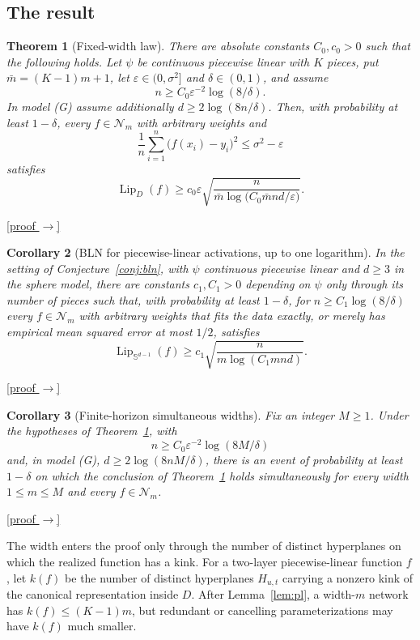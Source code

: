 \documentclass[11pt,reqno]{amsart}
\theoremstyle{plain}
\newtheorem{theorem}{Theorem}[section]
\newtheorem{corollary}[theorem]{Corollary}
\theoremstyle{definition}
\theoremstyle{remark}
\newcommand{\Sd}{\mathbb{S}^{d-1}}
\newcommand{\eps}{\varepsilon}
\newcommand{\Lip}{\operatorname{Lip}}
\newcommand{\NN}{\mathcal{N}}
\newcommand{\proofbutton}[1]{\hyperref[proof:#1]{\textnormal{\footnotesize\textsf{[proof $\to$]}}}}
\begin{document}
\subsection{The result}

\begin{theorem}[Fixed-width law]\label{thm:main}
There are absolute constants $C_0,c_0>0$ such that the following holds. Let $\psi$ be continuous piecewise linear with $K$ pieces, put $\bar m=(K-1)m+1$, let $\eps\in(0,\sigma^2]$ and $\delta\in(0,1)$, and assume
\[
        n\ge C_0\eps^{-2}\log(8/\delta).
\]
In model (G) assume additionally $d\ge2\log(8n/\delta)$. Then, with probability at least $1-\delta$, every $f\in\NN_m$ with arbitrary weights and
\[
\frac1n\sum_{i=1}^n\bigl(f(x_i)-y_i\bigr)^2\le\sigma^2-\eps
\]
satisfies
\[
\Lip_D(f)\ge c_0\eps\sqrt{\frac{n}{\bar m\log\!\bigl(C_0\bar mnd/\eps\bigr)}}.
\]
\end{theorem}
\proofbutton{main}

\begin{corollary}[BLN for piecewise-linear activations, up to one logarithm]\label{cor:bln}
In the setting of Conjecture~\ref{conj:bln}, with $\psi$ continuous piecewise linear and $d\ge3$ in the sphere model, there are constants $c_1,C_1>0$ depending on $\psi$ only through its number of pieces such that, with probability at least $1-\delta$, for $n\ge C_1\log(8/\delta)$ every $f\in\NN_m$ with arbitrary weights that fits the data exactly, or merely has empirical mean squared error at most $1/2$, satisfies
\[
\Lip_{\Sd}(f)\ge c_1\sqrt{\frac{n}{m\log(C_1mnd)}}.
\]
\end{corollary}
\proofbutton{bln}

\begin{corollary}[Finite-horizon simultaneous widths]\label{cor:simul}
Fix an integer $M\ge1$. Under the hypotheses of Theorem~\ref{thm:main}, with
\[
        n\ge C_0\eps^{-2}\log(8M/\delta)
\]
and, in model (G), $d\ge2\log(8nM/\delta)$, there is an event of probability at least $1-\delta$ on which the conclusion of Theorem~\ref{thm:main} holds simultaneously for every width $1\le m\le M$ and every $f\in\NN_m$.
\end{corollary}
\proofbutton{simul}

The width enters the proof only through the number of distinct hyperplanes on which the realized function has a kink. For a two-layer piecewise-linear function $f$, let $k(f)$ be the number of distinct hyperplanes $H_{u,t}$ carrying a nonzero kink of the canonical representation inside $D$. After Lemma~\ref{lem:pl}, a width-$m$ network has $k(f)\le(K-1)m$, but redundant or cancelling parameterizations may have $k(f)$ much smaller.
\end{document}
